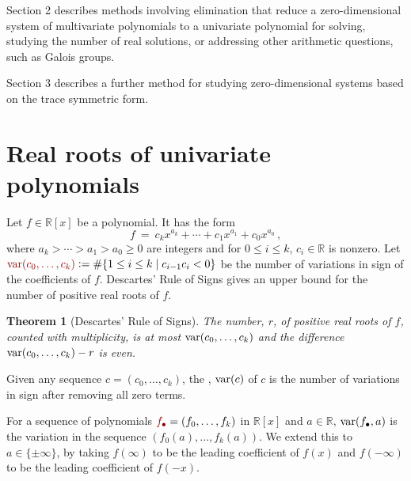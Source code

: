 \documentclass[12pt]{amsart}
\newtheorem{theorem}{Theorem}
\theoremstyle{definition}
\newcommand{\RR}{\mathbb{R}}
\DeclareMathOperator{\var}{{\rm var}}
\newcommand{\defcolor}[1]{{\color{TAMU}#1}}
\newcommand{\demph}[1]{\defcolor{{\sl #1}}}
\begin{document}
Section 2 describes methods involving elimination that reduce a zero-dimensional system of multivariate polynomials to a univariate
polynomial for solving, studying the number of real solutions, or addressing other arithmetic questions, such as Galois groups.

Section 3 describes a further method for studying zero-dimensional systems based on the trace symmetric form.


\section{Real roots of univariate polynomials}\label{S:one}

Let $f\in\RR[x]$ be a polynomial.
It has the form
%
 \[
   f\ =\ c_kx^{a_k}  + \dotsb + c_{1}x^{a_{1}} + c_0x^{a_0}\,,
 \]
%
where $a_k> \dotsb > a_1 > a_0 \geq 0$ are integers and for $0\leq i \leq k$, $c_{i}\in\RR$ is nonzero.
Let $\defcolor{\var(c_0,\dotsc,c_k)}\vcentcolon=\#\{1\leq i\leq k\mid c_{i-1}c_i<0\}$ be the number of variations in sign of the
coefficients of $f$.
Descartes' Rule of Signs \cite{So_Book} gives an upper bound for the number of positive real roots of $f$.

\begin{theorem}[Descartes' Rule of Signs]
  The number, $r$,  of positive real roots of $f$, counted with multiplicity, is at most $\var(c_0,\dotsc,c_k)$ and the difference
  $\var(c_0,\dotsc,c_k)-r$ is even.
\end{theorem}

Given any sequence $c=(c_0,\dotsc,c_k)$, the \demph{variation},  \defcolor{$\var(c)$} of $c$ is the
number of variations in sign after removing all zero terms.
%
\begin{leftbar}

\end{leftbar}
%
For a sequence of polynomials  $\defcolor{f_\bullet}=(f_0,\dotsc,f_k)$ in $\RR[x]$ and $a\in\RR$, \defcolor{$\var(f_\bullet,a)$} is the
variation in the sequence 
$(f_0(a),\dotsc,f_{k}(a))$. 
We extend this to $a\in\{\pm\infty\}$, by taking $f(\infty)$ to be the leading coefficient of $f(x)$ and $f(-\infty)$ to be the leading
coefficient of $f(-x)$.
\end{document}
